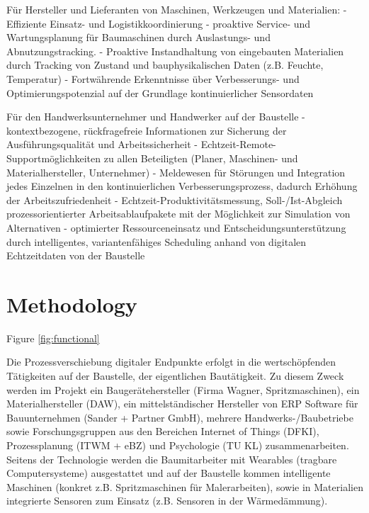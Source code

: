Für Hersteller und Lieferanten von Maschinen, Werkzeugen und Materialien:
- Effiziente Einsatz- und Logistikkoordinierung 
- proaktive Service- und Wartungsplanung für Baumaschinen durch Auslastungs- und Abnutzungstracking.
- Proaktive Instandhaltung von eingebauten Materialien durch Tracking von Zustand und bauphysikalischen Daten (z.B. Feuchte, Temperatur) 
- Fortwährende Erkenntnisse über Verbesserungs- und Optimierungspotenzial auf der Grundlage kontinuierlicher Sensordaten


Für den Handwerksunternehmer und Handwerker auf der Baustelle
- kontextbezogene, rückfragefreie Informationen zur Sicherung der Ausführungsqualität und Arbeitssicherheit
- Echtzeit-Remote-Supportmöglichkeiten zu allen Beteiligten (Planer, Maschinen- und Materialhersteller, Unternehmer)
- Meldewesen für Störungen und Integration jedes Einzelnen in den kontinuierlichen Verbesserungsprozess, dadurch Erhöhung der Arbeitszufriedenheit
- Echtzeit-Produktivitätsmessung, Soll-/Ist-Abgleich prozessorientierter Arbeitsablaufpakete mit der Möglichkeit zur Simulation von Alternativen
- optimierter Ressourceneinsatz und Entscheidungsunterstützung durch intelligentes, variantenfähiges Scheduling anhand von digitalen Echtzeitdaten von der Baustelle


\section{Methodology}
Figure \ref{fig:functional}



Die Prozessverschiebung digitaler Endpunkte erfolgt in die wertschöpfenden Tätigkeiten auf der Baustelle, der eigentlichen Bautätigkeit. Zu diesem Zweck werden im Projekt ein Baugerätehersteller (Firma Wagner, Spritzmaschinen), ein Materialhersteller (DAW), ein mittelständischer Hersteller von ERP Software für Bauunternehmen (Sander + Partner GmbH), mehrere Handwerks-/Baubetriebe sowie Forschungsgruppen aus den Bereichen Internet of Things (DFKI), Prozessplanung (ITWM + eBZ) und Psychologie (TU KL) zusammenarbeiten. Seitens der Technologie werden die Baumitarbeiter mit Wearables (tragbare Computersysteme) ausgestattet und auf der Baustelle kommen intelligente Maschinen (konkret z.B. Spritzmaschinen für Malerarbeiten), sowie in Materialien integrierte Sensoren zum Einsatz (z.B. Sensoren in der Wärmedämmung).


